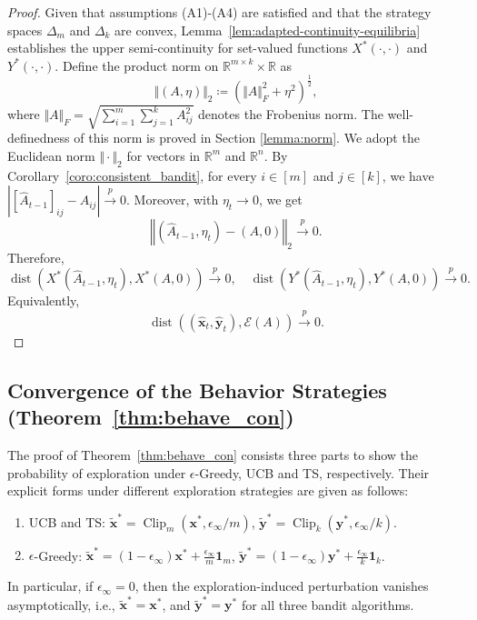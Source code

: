 \documentclass[12pt]{article}
\begin{document}
\begin{proof}
Given that assumptions (A1)-(A4) are satisfied and that the strategy spaces $\Delta_{m}$ and $\Delta_{k}$ are convex, Lemma~\ref{lem:adapted-continuity-equilibria} establishes the upper semi-continuity for set-valued functions $X^\ast(\cdot,\cdot)$ and $Y^\ast(\cdot,\cdot)$.
Define the product norm on $\mathbb{R}^{m \times k} \times \mathbb{R}$ as
$$\Vert (A,\eta) \Vert_2\coloneqq (\Vert A \Vert_F^2+\eta^2)^{\frac{1}{2}},$$ 
where $\Vert A \Vert_F = \sqrt{\sum_{i=1} ^m \sum_{j=1}^k A_{ij}^2}$ denotes the Frobenius norm. The well-definedness of this norm is proved in Section \ref{lemma:norm}. We adopt the Euclidean norm $\Vert \cdot \Vert_2$ for vectors in $\mathbb{R}^m$ and $\mathbb{R}^n$.
By Corollary~\ref{coro:consistent_bandit}, for every $i\in[m]$ and
$j\in[k]$, we have $\left|[\widehat A_{t-1}]_{ij}-A_{ij}\right| \stackrel{p}{\to}0$.
Moreover, with $\eta_t\to0$, we get
\[
\left\Vert
(\widehat A_{t-1},\eta_t)-(A,0)
\right\Vert_2
\stackrel{p}{\to}0.
\]
Therefore,
\begin{equation*}
\operatorname{dist}
\left(X^\ast(\widehat A_{t-1},\eta_t),X^\ast(A,0) \right)
\stackrel{p}{\to}0, \quad 
\operatorname{dist} 
\left(Y^\ast(\widehat A_{t-1},\eta_t),Y^\ast(A,0) \right)
\stackrel{p}{\to}0.
\end{equation*}
Equivalently,
\[
\operatorname{dist}
\left(
(\widehat{\bm x}_t,\widehat{\bm y}_t),
\mathcal E(A)
\right)
\stackrel{p}{\to}
0.
\]
\end{proof}

\subsection{Convergence of the Behavior Strategies (Theorem~\ref{thm:behave_con})}
\label{app:nash_behave_proof}

The proof of Theorem~\ref{thm:behave_con} consists three parts to show the probability of exploration under $\epsilon$-Greedy, UCB and TS, respectively. Their explicit forms under different exploration strategies are given as follows:
\begin{enumerate}
    \item[\textnormal{(1)}] UCB and TS: $\widetilde{\bm x}^\ast = \operatorname{Clip}_{m}(\bm x^\ast,\epsilon_\infty/m)$, $\widetilde{\bm y}^\ast = \operatorname{Clip}_{k}(\bm y^\ast,\epsilon_\infty/k)$.
    \item[\textnormal{(2)}] $\epsilon$-Greedy: $\widetilde{\bm x}^\ast = (1-\epsilon_\infty)\bm x^\ast + \frac{\epsilon_\infty}{m}\bm 1_m$, $\widetilde{\bm y}^\ast =(1-\epsilon_\infty)\bm y^\ast + \frac{\epsilon_\infty}{k}\bm 1_k$.
\end{enumerate}
In particular, if $\epsilon_\infty=0$, then the exploration-induced
perturbation vanishes asymptotically, i.e., $\widetilde{\bm x}^\ast=\bm x^\ast$, and $\widetilde{\bm y}^\ast=\bm y^\ast$ for all three bandit algorithms.
\end{document}
